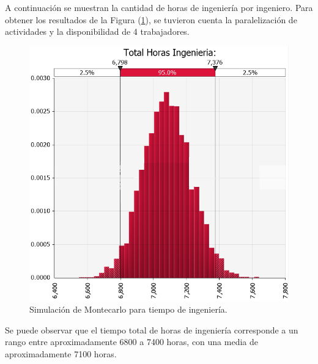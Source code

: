 A continuación se muestran la cantidad de horas de ingeniería por ingeniero. Para obtener los resultados de la Figura (\ref{fig:montecarlo_tiempos_ing}), se tuvieron cuenta la paralelización de actividades y la disponibilidad de 4 trabajadores.
\begin{figure}[H]
	\centering
	\includegraphics[width=0.5\linewidth]{ImagenesFactibilidad/montecarlo_tiempo_largo}	
	\caption{Simulación de Montecarlo para tiempo de ingeniería.}
	\label{fig:montecarlo_tiempos_ing}
\end{figure}

Se puede observar que el tiempo total de horas de ingeniería corresponde a un rango entre aproximadamente 6800 a 7400 horas, con una media de aproximadamente 7100 horas.